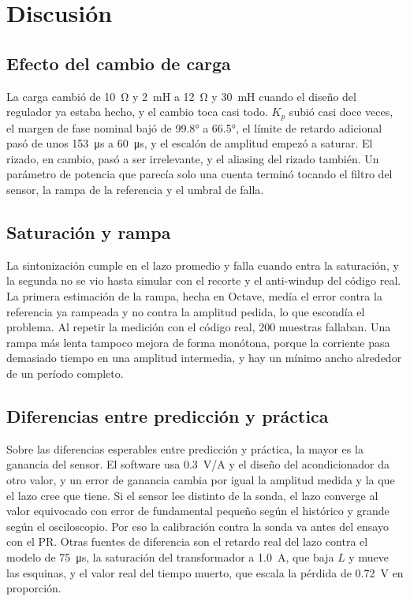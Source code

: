\documentclass[journal]{IEEEtran}
\begin{document}
\section{Discusión}
\label{sec:discusion}
\subsection{Efecto del cambio de carga}
La carga cambió de \SI{10}{\ohm} y \SI{2}{mH} a \SI{12}{\ohm} y \SI{30}{mH} cuando el diseño del regulador ya estaba hecho, y el cambio toca casi todo. $K_p$ subió casi doce veces, el margen de fase nominal bajó de \ang{99.8} a \ang{66.5}, el límite de retardo adicional pasó de unos \SI{153}{\micro s} a \SI{60}{\micro s}, y el escalón de amplitud empezó a saturar. El rizado, en cambio, pasó a ser irrelevante, y el aliasing del rizado también. Un parámetro de potencia que parecía solo una cuenta terminó tocando el filtro del sensor, la rampa de la referencia y el umbral de falla.

\subsection{Saturación y rampa}
La sintonización cumple en el lazo promedio y falla cuando entra la saturación, y la segunda no se vio hasta simular con el recorte y el anti-windup del código real. La primera estimación de la rampa, hecha en Octave, medía el error contra la referencia ya rampeada y no contra la amplitud pedida, lo que escondía el problema. Al repetir la medición con el código real, \num{200} muestras fallaban. Una rampa más lenta tampoco mejora de forma monótona, porque la corriente pasa demasiado tiempo en una amplitud intermedia, y hay un mínimo ancho alrededor de un período completo.

\subsection{Diferencias entre predicción y práctica}
Sobre las diferencias esperables entre predicción y práctica, la mayor es la ganancia del sensor. El software usa \SI{0.3}{V/A} y el diseño del acondicionador da otro valor, y un error de ganancia cambia por igual la amplitud medida y la que el lazo cree que tiene. Si el sensor lee distinto de la sonda, el lazo converge al valor equivocado con error de fundamental pequeño según el histórico y grande según el osciloscopio. Por eso la calibración contra la sonda va antes del ensayo con el PR. Otras fuentes de diferencia son el retardo real del lazo contra el modelo de \SI{75}{\micro s}, la saturación del transformador a \SI{1.0}{A}, que baja $L$ y mueve las esquinas, y el valor real del tiempo muerto, que escala la pérdida de \SI{0.72}{V} en proporción.
\end{document}
